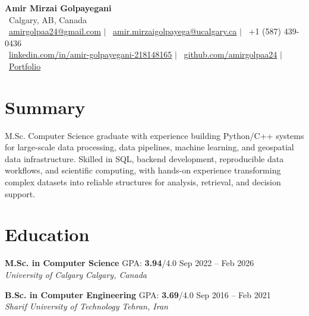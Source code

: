 \documentclass[a4paper,10pt]{article}
\newcommand{\resumeEducationSubheading}[5]{
    \textbf{#1} \hfill #2 \hfill #3 \\
    \textit{#4} \hfill \textit{#5}
}
\begin{document}

\begin{center}
    {\LARGE \textbf{Amir Mirzai Golpayegani}} \\[0.25em]
    \faMapMarker*~Calgary, AB, Canada \\[0.25em]
    \faEnvelope~\href{mailto:amirgolpaa24@gmail.com}{amirgolpaa24@gmail.com}
    $|$
    \faEnvelope~\href{mailto:amir.mirzaigolpayega@ucalgary.ca}{amir.mirzaigolpayega@ucalgary.ca}
    $|$
    \faPhone*~+1 (587) 439-0436 \\[0.25em]
    \faLinkedin~\href{https://linkedin.com/in/amir-golpayegani-218148165}{linkedin.com/in/amir-golpayegani-218148165}
    $|$
    \faGithub~\href{https://github.com/amirgolpaa24}{github.com/amirgolpaa24}
    $|$
    \faGlobe~\href{https://amir-portfolio-navy.vercel.app/}{Portfolio}
\end{center}


\section*{Summary}

M.Sc. Computer Science graduate with experience building Python/C++ systems for large-scale data processing, data pipelines, machine learning, and geospatial data infrastructure. Skilled in SQL, backend development, reproducible data workflows, and scientific computing, with hands-on experience transforming complex datasets into reliable structures for analysis, retrieval, and decision support.


\section*{Education}

\resumeEducationSubheading
{M.Sc. in Computer Science}
{GPA: \textbf{3.94}/4.0}
{Sep 2022 -- Feb 2026}
{University of Calgary}
{Calgary, Canada}

\vspace{0.35em}

\resumeEducationSubheading
{B.Sc. in Computer Engineering}
{GPA: \textbf{3.69}/4.0}
{Sep 2016 -- Feb 2021}
{Sharif University of Technology}
{Tehran, Iran}

\end{document}
